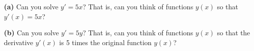 \noindent \textbf{(a)} Can you solve $y'=5x$?  That is, can you think of functions $y(x)$ so that $y'(x)=5x$?

\vspace{1.5in}

\noindent \textbf{(b)} Can you solve $y'=5y$?  That is, can you think of functions $y(x)$ so that the derivative $y'(x)$ is 5 times the original function $y(x)$?
